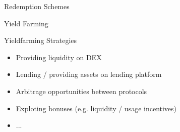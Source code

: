 \documentclass[handout]{beamer}
\begin{document}
\begin{frame}{Redemption Schemes}

	
\end{frame}


\begin{frame}{Yield Farming}

Yieldfarming Strategies \\ \vspace{1em}

	\begin{itemize}
	

		\item<1-> Providing liquidity on DEX
		\item<2-> Lending / providing assets on lending platform
		\item<3-> Arbitrage opportunities between protocols
		\item<4-> Exploting bonuses (e.g. liquidity / usage incentives)
		\item<4->...
	\end{itemize}


	
\end{frame}
\end{document}
